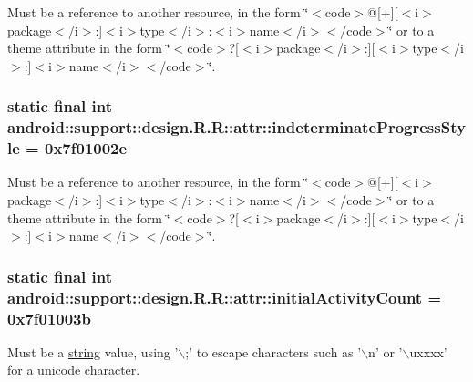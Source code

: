 Must be a reference to another resource, in the form \char`\"{}$<$code$>$@\mbox{[}+\mbox{]}\mbox{[}$<$i$>$package$<$/i$>$:\mbox{]}$<$i$>$type$<$/i$>$:$<$i$>$name$<$/i$>$$<$/code$>$\char`\"{} or to a theme attribute in the form \char`\"{}$<$code$>$?\mbox{[}$<$i$>$package$<$/i$>$:\mbox{]}\mbox{[}$<$i$>$type$<$/i$>$:\mbox{]}$<$i$>$name$<$/i$>$$<$/code$>$\char`\"{}. \hypertarget{classandroid_1_1support_1_1design_1_1_r_1_1attr_ed140cfbeb2adc46663132545e53be10}{
\subsubsection[{indeterminateProgressStyle}]{\setlength{\rightskip}{0pt plus 5cm}static final int android::support::design.R.R::attr::indeterminateProgressStyle = 0x7f01002e}}
\label{classandroid_1_1support_1_1design_1_1_r_1_1attr_ed140cfbeb2adc46663132545e53be10}


Must be a reference to another resource, in the form \char`\"{}$<$code$>$@\mbox{[}+\mbox{]}\mbox{[}$<$i$>$package$<$/i$>$:\mbox{]}$<$i$>$type$<$/i$>$:$<$i$>$name$<$/i$>$$<$/code$>$\char`\"{} or to a theme attribute in the form \char`\"{}$<$code$>$?\mbox{[}$<$i$>$package$<$/i$>$:\mbox{]}\mbox{[}$<$i$>$type$<$/i$>$:\mbox{]}$<$i$>$name$<$/i$>$$<$/code$>$\char`\"{}. \hypertarget{classandroid_1_1support_1_1design_1_1_r_1_1attr_f82e317a27314149f2a7d2be06668921}{
\subsubsection[{initialActivityCount}]{\setlength{\rightskip}{0pt plus 5cm}static final int android::support::design.R.R::attr::initialActivityCount = 0x7f01003b}}
\label{classandroid_1_1support_1_1design_1_1_r_1_1attr_f82e317a27314149f2a7d2be06668921}


Must be a \hyperlink{classandroid_1_1support_1_1design_1_1_r_1_1string}{string} value, using '$\backslash$;' to escape characters such as '$\backslash$n' or '$\backslash$uxxxx' for a unicode character. 

